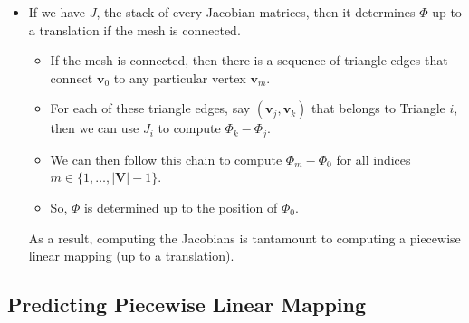 \documentclass[10pt]{article}
\newcommand{\ve}[1]{\mathbf{#1}}
\begin{document}
\begin{itemize}
    \item If we have $J$, the stack of every Jacobian matrices, then it determines $\Phi$ up to a translation if the mesh is connected.
    \begin{itemize}
        \item If the mesh is connected, then there is a sequence of triangle edges that connect $\ve{v}_0$ to any particular vertex $\ve{v}_m$.
        \item For each of these triangle edges, say $(\ve{v}_j, \ve{v}_k)$ that belongs to Triangle $i$, then we can use $J_i$ to compute $\Phi_k - \Phi_j$.
        \item We can then follow this chain to compute $\Phi_m - \Phi_0$ for all indices $m \in \{1, \dotsc, |\ve{V}|-1\}$.
        \item So, $\Phi$ is determined up to the position of $\Phi_0$.
    \end{itemize}
    As a result, computing the Jacobians is tantamount to computing a piecewise linear mapping (up to a translation).
\end{itemize}

\subsection{Predicting Piecewise Linear Mapping}
\end{document}
